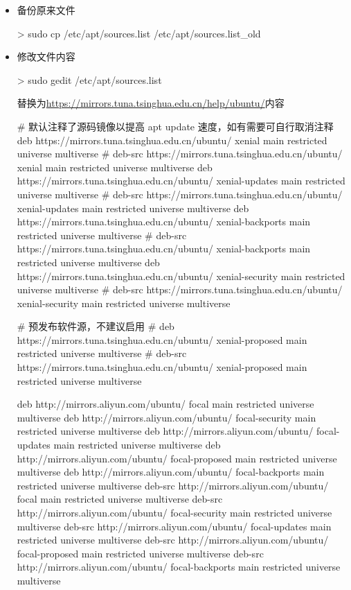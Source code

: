 \begin{itemize}
\item 备份原来文件
\begin{commandbox}
 > sudo cp /etc/apt/sources.list /etc/apt/sources.list_old
\end{commandbox}

\item 修改文件内容
\begin{commandbox}
 > sudo gedit /etc/apt/sources.list
\end{commandbox}
替换为\url{https://mirrors.tuna.tsinghua.edu.cn/help/ubuntu/}内容
\begin{messagebox}
# 默认注释了源码镜像以提高 apt update 速度，如有需要可自行取消注释
deb https://mirrors.tuna.tsinghua.edu.cn/ubuntu/ xenial main restricted universe multiverse
# deb-src https://mirrors.tuna.tsinghua.edu.cn/ubuntu/ xenial main restricted universe multiverse
deb https://mirrors.tuna.tsinghua.edu.cn/ubuntu/ xenial-updates main restricted universe multiverse
# deb-src https://mirrors.tuna.tsinghua.edu.cn/ubuntu/ xenial-updates main restricted universe multiverse
deb https://mirrors.tuna.tsinghua.edu.cn/ubuntu/ xenial-backports main restricted universe multiverse
# deb-src https://mirrors.tuna.tsinghua.edu.cn/ubuntu/ xenial-backports main restricted universe multiverse
deb https://mirrors.tuna.tsinghua.edu.cn/ubuntu/ xenial-security main restricted universe multiverse
# deb-src https://mirrors.tuna.tsinghua.edu.cn/ubuntu/ xenial-security main restricted universe multiverse

# 预发布软件源，不建议启用
# deb https://mirrors.tuna.tsinghua.edu.cn/ubuntu/ xenial-proposed main restricted universe multiverse
# deb-src https://mirrors.tuna.tsinghua.edu.cn/ubuntu/ xenial-proposed main restricted universe multiverse
\end{messagebox}

\begin{messagebox}
deb http://mirrors.aliyun.com/ubuntu/ focal main restricted universe multiverse
deb http://mirrors.aliyun.com/ubuntu/ focal-security main restricted universe multiverse
deb http://mirrors.aliyun.com/ubuntu/ focal-updates main restricted universe multiverse
deb http://mirrors.aliyun.com/ubuntu/ focal-proposed main restricted universe multiverse
deb http://mirrors.aliyun.com/ubuntu/ focal-backports main restricted universe multiverse
deb-src http://mirrors.aliyun.com/ubuntu/ focal main restricted universe multiverse
deb-src http://mirrors.aliyun.com/ubuntu/ focal-security main restricted universe multiverse
deb-src http://mirrors.aliyun.com/ubuntu/ focal-updates main restricted universe multiverse
deb-src http://mirrors.aliyun.com/ubuntu/ focal-proposed main restricted universe multiverse
deb-src http://mirrors.aliyun.com/ubuntu/ focal-backports main restricted universe multiverse


\end{messagebox}
\end{itemize}
